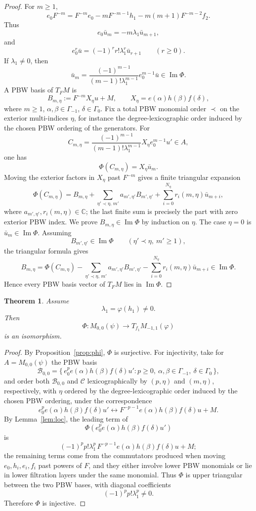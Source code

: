\documentclass[11pt]{article}
\newcommand{\C}{\mathbb C}
\newcommand{\G}{\Gamma}
\newcommand{\im}{\operatorname{Im}}
\theoremstyle{plain}
\newtheorem{theorem}[lemma]{Theorem}
\theoremstyle{remark}
\begin{document}
\begin{proof}
For \(m\ge1\),
\[
  e_0F^{-m}=F^{-m}e_0-mF^{-m-1}h_1-m(m+1)F^{-m-2}f_2.
\]
Thus
\[
  e_0\bar u_m=-m\lambda_1\bar u_{m+1},
\]
and
\[
  e_0^r\bar u=(-1)^rr!\lambda_1^r\bar u_{r+1}\qquad(r\ge0).
\]
If \(\lambda_1\ne0\), then
\[
  \bar u_m=\frac{(-1)^{m-1}}{(m-1)!\lambda_1^{m-1}}e_0^{m-1}\bar u\in\im\Phi.
\]
A PBW basis of \(T_FM\) is
\[
  B_{m,\eta}:=F^{-m}X_\eta u+M,
  \qquad
  X_\eta=e(\alpha)h(\beta)f(\delta),
\]
where \(m\ge1\), \(\alpha,\beta\in\G_{-1}\), \(\delta\in\G_0\). Fix a total PBW
monomial order \(\prec\) on the exterior multi-indices \(\eta\), for instance the
degree-lexicographic order induced by the chosen PBW ordering of the generators.
For
\[
  C_{m,\eta}=\frac{(-1)^{m-1}}{(m-1)!\lambda_1^{m-1}}X_\eta e_0^{m-1}u'\in A,
\]
one has
\[
  \Phi(C_{m,\eta})=X_\eta\bar u_m.
\]
Moving the exterior factors in \(X_\eta\) past \(F^{-m}\) gives a finite triangular
expansion
\[
  \Phi(C_{m,\eta})
  =
  B_{m,\eta}
  +
  \sum_{\eta'\prec\eta,\,m'}a_{m',\eta'}B_{m',\eta'}
  +
  \sum_{i=0}^{N_\eta}r_i(m,\eta)\bar u_{m+i},
\]
where \(a_{m',\eta'},r_i(m,\eta)\in\C\); the last finite sum is precisely the part
with zero exterior PBW index.
We prove \(B_{m,\eta}\in\im\Phi\) by induction on \(\eta\). The case \(\eta=0\) is
\(\bar u_m\in\im\Phi\). Assuming
\[
  B_{m',\eta'}\in\im\Phi\qquad(\eta'\prec\eta,\ m'\ge1),
\]
the triangular formula gives
\[
  B_{m,\eta}
  =
  \Phi(C_{m,\eta})
  -
  \sum_{\eta'\prec\eta,\,m'}a_{m',\eta'}B_{m',\eta'}
  -
  \sum_{i=0}^{N_\eta}r_i(m,\eta)\bar u_{m+i}
  \in\im\Phi.
\]
Hence every PBW basis vector of \(T_FM\) lies in \(\im\Phi\).
\end{proof}

\begin{theorem}\label{thm:iso}
Assume
\[
  \lambda_1=\varphi(h_1)\ne0.
\]
Then
\[
  \Phi:M_{0,0}(\psi)\longrightarrow T_{f_1}M_{-1,1}(\varphi)
\]
is an isomorphism.
\end{theorem}

\begin{proof}
By Proposition~\ref{prop:phi}, \(\Phi\) is surjective. For injectivity, take for
\(A=M_{0,0}(\psi)\) the PBW basis
\[
  \mathcal B_{0,0}
  =
  \{\,
    e_0^pe(\alpha)h(\beta)f(\delta)u':
    p\ge0,\ \alpha,\beta\in\G_{-1},\ \delta\in\G_0
  \,\},
\]
and order both \(\mathcal B_{0,0}\) and \(\mathcal C\) lexicographically by
\((p,\eta)\) and \((m,\eta)\), respectively, with \(\eta\) ordered by the
degree-lexicographic order induced by the chosen PBW ordering, under the
correspondence
\[
  e_0^pe(\alpha)h(\beta)f(\delta)u'
  \longleftrightarrow
  F^{-p-1}e(\alpha)h(\beta)f(\delta)u+M.
\]
By Lemma~\ref{lem:loc}, the leading term of
\[
  \Phi(e_0^pe(\alpha)h(\beta)f(\delta)u')
\]
is
\[
  (-1)^pp!\lambda_1^p\,F^{-p-1}e(\alpha)h(\beta)f(\delta)u+M;
\]
the remaining terms come from the commutators produced when moving
\(e_0,h_i,e_i,f_i\) past powers of \(F\), and they either involve lower PBW
monomials or lie in lower filtration layers under the same monomial. Thus
\(\Phi\) is upper triangular between the two PBW bases, with diagonal
coefficients
\[
  (-1)^pp!\lambda_1^p\ne0.
\]
Therefore \(\Phi\) is injective.
\end{proof}
\end{document}
